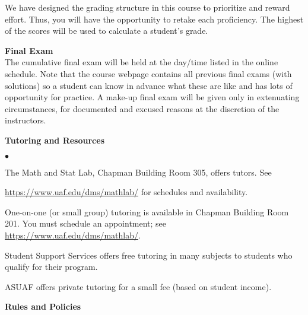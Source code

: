 \documentclass[12pt]{article}
\renewcommand{\emph}[1]{\textsf{\textbf{#1}}}
\newcommand{\localhead}[1]{\par\smallskip\textbf{#1}\nobreak\\}%
\def\heading#1{\localhead{\large\emph{#1}}}
\def\subheading#1{\localhead{\emph{#1}}}
\newenvironment{clist}%
{\bgroup\parskip 0pt\begin{list}{$\bullet$}{\partopsep 4pt\topsep 0pt\itemsep -2pt}}%
{\end{list}\egroup}%
\begin{document}
We have designed the grading structure in this course to prioritize and reward effort. Thus, you will have the opportunity to retake each proficiency. The highest of the scores will be used to calculate a student's grade. 

\heading{Final Exam} 
The cumulative final exam will be held at the day/time listed in the
online schedule. Note that the course webpage contains all previous final exams (with solutions) so a student can know in advance what these are like  and has lots of opportunity for practice.
A make-up final exam will be given only in extenuating circumstances, for documented and excused reasons at the discretion of the instructors.

\heading{Tutoring and Resources}
\vskip -30pt\strut
\begin{clist}
	\item The Math and Stat Lab, Chapman Building Room 305, offers tutors. 
	See 

	\url{https://www.uaf.edu/dms/mathlab/} for schedules and availability.
	\item One-on-one (or small group) tutoring is available in 
Chapman Building Room 201. You must schedule an
appointment; see \url{https://www.uaf.edu/dms/mathlab/}.
	\item Student Support Services offers free tutoring in many subjects to students who qualify for their program.
	\item ASUAF offers private tutoring for a small fee (based on student income).
\end{clist}

\heading{Rules and Policies}
\vskip -20pt

\end{document}

